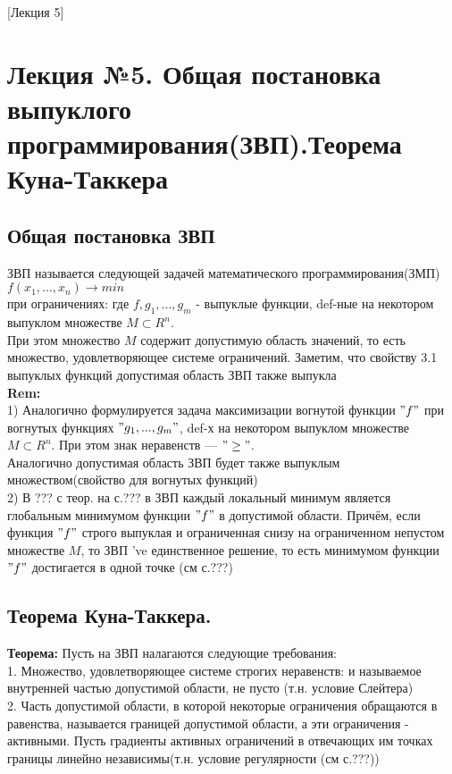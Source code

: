 [Лекция 5]

\newpage

\section*{Лекция №5. Общая постановка выпуклого программирования(ЗВП).Теорема Куна-Таккера}
\subsection*{Общая постановка ЗВП}
ЗВП называется следующей задачей математического программирования(ЗМП)\\
$f(x_1,...,x_n) \rightarrow min$\\
при ограничениях:
где $f,g_1,...,g_m$ - выпуклые функции, def-ные на некотором выпуклом множестве $M\subset R^n$.\\
При этом множество $M$ содержит допустимую область значений, то есть множество, удовлетворяющее системе ограничений. Заметим, что свойству 3.1 выпуклых функций допустимая область ЗВП также выпукла \\
\textbf{Rem:}\\
1) Аналогично формулируется задача максимизации вогнутой функции $"f"$ при вогнутых функциях $"g_1,...,g_m"$, def-х на некотором выпуклом множестве $M\subset R^n$. При этом знак неравенств --- $"\geq"$.\\
Аналогично допустимая область ЗВП будет также выпуклым множеством(свойство для вогнутых функций)\\
2) В ??? с теор. на с.??? в ЗВП каждый локальный минимум является глобальным минимумом функции $"f"$ в допустимой области. Причём, если функция $"f"$ строго выпуклая и ограниченная снизу на ограниченном непустом множестве $M$, то ЗВП 've единственное решение, то есть минимумом функции $"f"$ достигается в одной точке
 (см с.???)

\subsection*{Теорема Куна-Таккера.}
\textbf{Теорема:} Пусть на ЗВП налагаются следующие требования:\\
1. Множество, удовлетворяющее системе строгих неравенств:
и называемое внутренней частью допустимой области, не пусто (т.н. условие Слейтера) \\
2. Часть допустимой области, в которой некоторые ограничения обращаются в равенства, называется границей допустимой области, а эти ограничения - активными. Пусть градиенты активных ограничений в отвечающих им точках границы линейно независимы(т.н. условие регулярности (см с.???))\\

